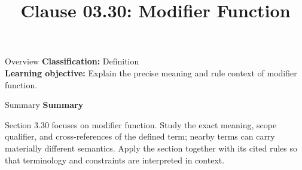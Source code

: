 \documentclass[10pt,letterpaper]{article}
\title{Clause 03.30: Modifier Function}
\author{}
\date{}
\begin{document}
\maketitle
\begin{CornellOverviewBox}{Overview}
\textbf{Classification:} Definition\\[2pt]
\textbf{Learning objective:} Explain the precise meaning and rule context of modifier function.
\end{CornellOverviewBox}\begin{CornellSummaryBox}{Summary}
{\sffamily\bfseries\color{Accent} Summary}\par\vspace{3pt}Section 3.30 focuses on modifier function. Study the exact meaning, scope qualifier, and cross-references of the defined term; nearby terms can carry materially different semantics. Apply the section together with its cited rules so that terminology and constraints are interpreted in context.
\end{CornellSummaryBox}
\end{document}

